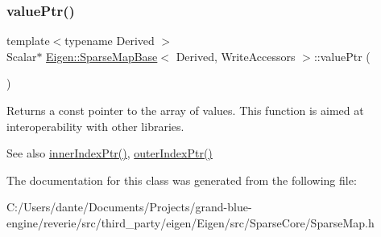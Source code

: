 \subsubsection{\texorpdfstring{valuePtr()}{valuePtr()}}
{\footnotesize\ttfamily template$<$typename Derived $>$ \\
Scalar$\ast$ \mbox{\hyperlink{class_eigen_1_1_sparse_map_base}{Eigen\+::\+Sparse\+Map\+Base}}$<$ Derived, Write\+Accessors $>$\+::value\+Ptr (\begin{DoxyParamCaption}{ }\end{DoxyParamCaption})\hspace{0.3cm}{\ttfamily [inline]}}





\begin{DoxyReturn}{Returns}
a const pointer to the array of values. This function is aimed at interoperability with other libraries. 
\end{DoxyReturn}
\begin{DoxySeeAlso}{See also}
\mbox{\hyperlink{class_eigen_1_1_sparse_map_base_3_01_derived_00_01_write_accessors_01_4_af5cd1f13dde8578eb9891a4ac4a11977}{inner\+Index\+Ptr()}}, \mbox{\hyperlink{class_eigen_1_1_sparse_map_base_3_01_derived_00_01_write_accessors_01_4_a3b74af754254837fc591cd9936688b95}{outer\+Index\+Ptr()}} 
\end{DoxySeeAlso}


The documentation for this class was generated from the following file\+:\begin{DoxyCompactItemize}
\item 
C\+:/\+Users/dante/\+Documents/\+Projects/grand-\/blue-\/engine/reverie/src/third\+\_\+party/eigen/\+Eigen/src/\+Sparse\+Core/Sparse\+Map.\+h\end{DoxyCompactItemize}
